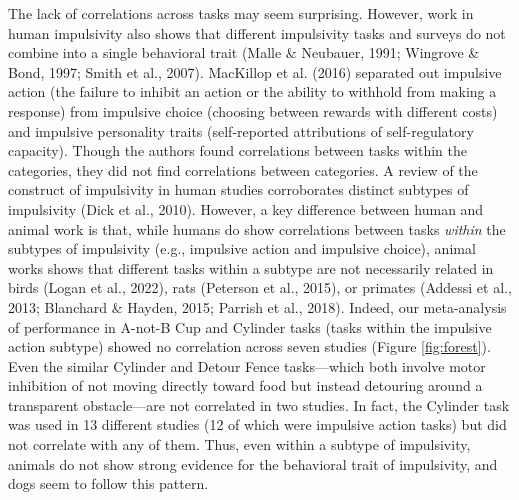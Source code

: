 \documentclass[
  ,pub,floatsintext]{apa6}
\begin{document}
The lack of correlations across tasks may seem surprising. However, work in human impulsivity also shows that different impulsivity tasks and surveys do not combine into a single behavioral trait (Malle \& Neubauer, 1991; Wingrove \& Bond, 1997; Smith et al., 2007). MacKillop et al. (2016) separated out impulsive action (the failure to inhibit an action or the ability to withhold from making a response) from impulsive choice (choosing between rewards with different costs) and impulsive personality traits (self-reported attributions of self-regulatory capacity). Though the authors found correlations between tasks within the categories, they did not find correlations between categories. A review of the construct of impulsivity in human studies corroborates distinct subtypes of impulsivity (Dick et al., 2010). However, a key difference between human and animal work is that, while humans do show correlations between tasks \emph{within} the subtypes of impulsivity (e.g., impulsive action and impulsive choice), animal works shows that different tasks within a subtype are not necessarily related in birds (Logan et al., 2022), rats (Peterson et al., 2015), or primates (Addessi et al., 2013; Blanchard \& Hayden, 2015; Parrish et al., 2018). Indeed, our meta-analysis of performance in A-not-B Cup and Cylinder tasks (tasks within the impulsive action subtype) showed no correlation across seven studies (Figure \ref{fig:forest}). Even the similar Cylinder and Detour Fence tasks---which both involve motor inhibition of not moving directly toward food but instead detouring around a transparent obstacle---are not correlated in two studies. In fact, the Cylinder task was used in 13 different studies (12 of which were impulsive action tasks) but did not correlate with any of them. Thus, even within a subtype of impulsivity, animals do not show strong evidence for the behavioral trait of impulsivity, and dogs seem to follow this pattern.
\end{document}
